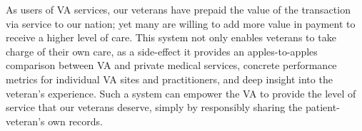 As users of VA services, our veterans have prepaid the value of the transaction via service to our nation; yet many are willing to add more value in payment to receive a higher level of care.
This system not only enables veterans to take charge of their own care, as a side-effect it provides an apples-to-apples comparison between VA and private medical services, concrete performance metrics for individual VA sites and practitioners, and deep insight into the veteran's experience.
Such a system can empower the VA to provide the level of service that our veterans deserve, simply by responsibly sharing the patient-veteran's own records.
